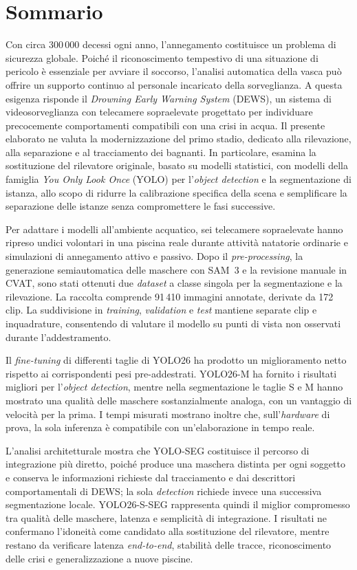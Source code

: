 \chapter*{Sommario}

Con circa 300\,000 decessi ogni anno, l'annegamento costituisce un problema di sicurezza globale. Poiché il riconoscimento tempestivo di una situazione di pericolo è essenziale per avviare il soccorso, l'analisi automatica della vasca può offrire un supporto continuo al personale incaricato della sorveglianza. A questa esigenza risponde il \textit{Drowning Early Warning System} (DEWS), un sistema di videosorveglianza con telecamere sopraelevate progettato per individuare precocemente comportamenti compatibili con una crisi in acqua. Il presente elaborato ne valuta la modernizzazione del primo stadio, dedicato alla rilevazione, alla separazione e al tracciamento dei bagnanti. In particolare, esamina la sostituzione del rilevatore originale, basato su modelli statistici, con modelli della famiglia \textit{You Only Look Once} (YOLO) per l'\textit{object detection} e la segmentazione di istanza, allo scopo di ridurre la calibrazione specifica della scena e semplificare la separazione delle istanze senza compromettere le fasi successive.

Per adattare i modelli all'ambiente acquatico, sei telecamere sopraelevate hanno ripreso undici volontari in una piscina reale durante attività natatorie ordinarie e simulazioni di annegamento attivo e passivo. Dopo il \textit{pre-processing}, la generazione semiautomatica delle maschere con SAM~3 e la revisione manuale in CVAT, sono stati ottenuti due \textit{dataset} a classe singola per la segmentazione e la rilevazione. La raccolta comprende 91\,410 immagini annotate, derivate da 172 clip. La suddivisione in \textit{training}, \textit{validation} e \textit{test} mantiene separate clip e inquadrature, consentendo di valutare il modello su punti di vista non osservati durante l'addestramento.

Il \textit{fine-tuning} di differenti taglie di YOLO26 ha prodotto un miglioramento netto rispetto ai corrispondenti pesi pre-addestrati. YOLO26-M ha fornito i risultati migliori per l'\textit{object detection}, mentre nella segmentazione le taglie S e M hanno mostrato una qualità delle maschere sostanzialmente analoga, con un vantaggio di velocità per la prima. I tempi misurati mostrano inoltre che, sull'\textit{hardware} di prova, la sola inferenza è compatibile con un'elaborazione in tempo reale.

L'analisi architetturale mostra che YOLO-SEG costituisce il percorso di integrazione più diretto, poiché produce una maschera distinta per ogni soggetto e conserva le informazioni richieste dal tracciamento e dai descrittori comportamentali di DEWS; la sola \textit{detection} richiede invece una successiva segmentazione locale. \mbox{YOLO26-S-SEG} rappresenta quindi il miglior compromesso tra qualità delle maschere, latenza e semplicità di integrazione. I risultati ne confermano l'idoneità come candidato alla sostituzione del rilevatore, mentre restano da verificare latenza \textit{end-to-end}, stabilità delle tracce, riconoscimento delle crisi e generalizzazione a nuove piscine.
